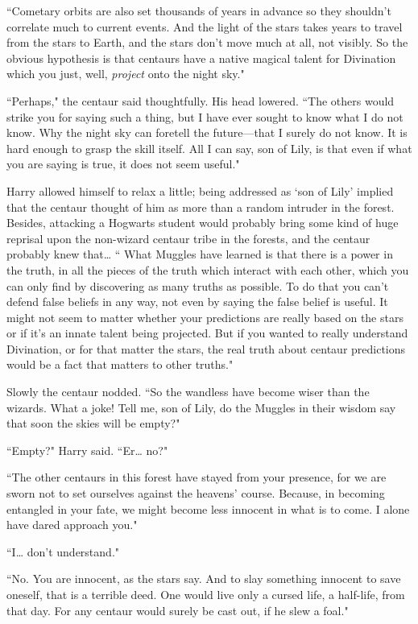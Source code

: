 ``Cometary orbits are also set thousands of years in advance so they shouldn't correlate much to current events. And the light of the stars takes years to travel from the stars to Earth, and the stars don't move much at all, not visibly. So the obvious hypothesis is that centaurs have a native magical talent for Divination which you just, well, \emph{project} onto the night sky."

``Perhaps," the centaur said thoughtfully. His head lowered. ``The others would strike you for saying such a thing, but I have ever sought to know what I do not know. Why the night sky can foretell the future—that I surely do not know. It is hard enough to grasp the skill itself. All I can say, son of Lily, is that even if what you are saying is true, it does not seem useful."

Harry allowed himself to relax a little; being addressed as `son of Lily' implied that the centaur thought of him as more than a random intruder in the forest. Besides, attacking a Hogwarts student would probably bring some kind of huge reprisal upon the non-wizard centaur tribe in the forests, and the centaur probably knew that{\ldots} `` What Muggles have learned is that there is a power in the truth, in all the pieces of the truth which interact with each other, which you can only find by discovering as many truths as possible. To do that you can't defend false beliefs in any way, not even by saying the false belief is useful. It might not seem to matter whether your predictions are really based on the stars or if it's an innate talent being projected. But if you wanted to really understand Divination, or for that matter the stars, the real truth about centaur predictions would be a fact that matters to other truths."

Slowly the centaur nodded. ``So the wandless have become wiser than the wizards. What a joke! Tell me, son of Lily, do the Muggles in their wisdom say that soon the skies will be empty?"

``Empty?" Harry said. ``Er{\ldots} no?"

``The other centaurs in this forest have stayed from your presence, for we are sworn not to set ourselves against the heavens' course. Because, in becoming entangled in your fate, we might become less innocent in what is to come. I alone have dared approach you."

``I{\ldots} don't understand."

``No. You are innocent, as the stars say. And to slay something innocent to save oneself, that is a terrible deed. One would live only a cursed life, a half-life, from that day. For any centaur would surely be cast out, if he slew a foal."

